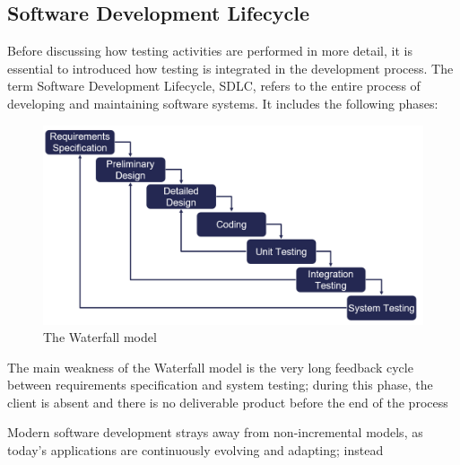 \subsection{Software Development Lifecycle}
Before discussing how testing activities are performed in more detail, it is essential to introduced how testing is integrated in the development process. The term Software Development Lifecycle, SDLC, refers to the entire process of developing and maintaining software systems. It includes the following phases:

\begin{figure}[h]
    \centering
    \includegraphics[width=\linewidth]{figures/waterfall_model.png}
    \caption{The Waterfall model}
    \label{waterfall_model}
\end{figure}

The main weakness of the Waterfall model is the very long feedback cycle between requirements specification and system testing; during this phase, the client is absent and there is no deliverable product before the end of the process

Modern software development strays away from non-incremental models, as today's applications are continuously evolving and adapting; instead

